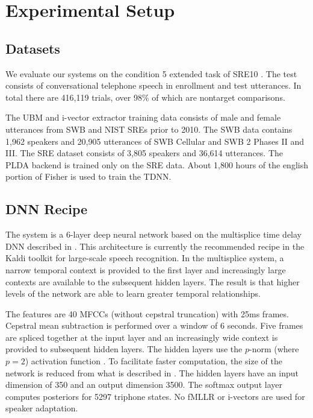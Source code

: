 \documentclass{article}
\begin{document}
\section{Experimental Setup}

\subsection{Datasets}
\label{datasets}
We evaluate our systems on the condition 5 extended task of 
SRE10 \cite{sre10}. The test consists of conversational telephone speech
in enrollment and test utterances. In total there are 416,119 trials,
over 98\% of which are nontarget comparisons. 

The UBM and i-vector extractor training data consists of male and female
utterances from SWB and NIST SREs prior to 2010. The SWB data contains
1,962 speakers and 20,905 utterances of SWB Cellular and SWB 2 
Phases II and III. The SRE dataset consists of 3,805 speakers 
and 36,614 utterances.
The PLDA backend is trained only on the SRE data. About 1,800 hours
of the english portion of Fisher \cite{fisher} is
used to train the TDNN.

\subsection{DNN Recipe}
\label{dnn_recipe}

The system is a 6-layer deep neural network based on the multisplice 
time delay DNN described
in \cite{multisplice}. This architecture is currently the recommended
recipe in the Kaldi toolkit \cite{kaldi} for large-scale speech recognition. 
In the multisplice system, a narrow temporal
context is provided to the first layer and increasingly large 
contexts are available to the subsequent hidden layers. The result is that
higher levels of the network are able to learn greater temporal
relationships. 

The features are 40 MFCCs (without cepstral
truncation) with 25ms frames. Cepstral mean subtraction is 
performed over a window of
6 seconds. Five frames are spliced together at the
input layer and an increasingly wide context is provided to 
subsequent hidden layers. The hidden layers use the $p$-norm (where $p=2$)
activation function \cite{pnorm}. 
To facilitate faster computation, the size of the network is reduced
from what is described in \cite{multisplice}. The hidden layers have an 
input dimension of 350 and an output dimension 3500. 
The softmax output layer computes posteriors for 5297 triphone states. No
fMLLR or i-vectors are used for speaker adaptation.
\end{document}
